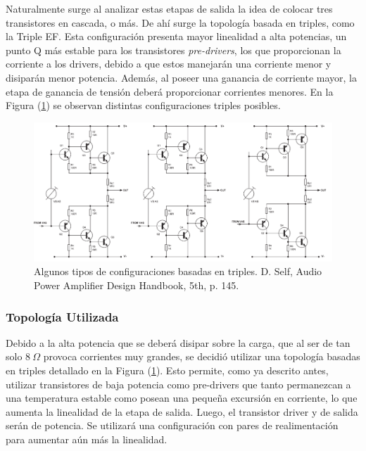 Naturalmente surge al analizar estas etapas de salida la idea de colocar tres transistores en cascada, o más. De ahí surge la topología basada en triples, como la Triple EF. Esta configuración presenta mayor linealidad a alta potencias, un punto Q más estable para los transistores \textit{pre-drivers}, los que proporcionan la corriente a los drivers, debido a que estos manejarán una corriente menor y disiparán menor potencia. Además, al poseer una ganancia de corriente mayor, la etapa de ganancia de tensión deberá proporcionar corrientes menores. En la Figura (\ref{fig:triples}) se observan distintas configuraciones triples posibles.

\begin{figure}[H]
\centering
	\includegraphics[width=\textwidth]{ImagenesOutput-Stage/pag145-triples.png}
	\caption{Algunos tipos de configuraciones basadas en triples. D. Self, Audio Power Amplifier Design Handbook, 5th, p. 145.}
	\label{fig:triples}
\end{figure}

\subsubsection{Topología Utilizada}
Debido a la alta potencia que se deberá disipar sobre la carga, que al ser de tan solo $8 \ \Omega$ provoca corrientes muy grandes, se decidió utilizar una topología basadas en triples detallado en la Figura (\ref{fig:triples}). Esto permite, como ya descrito antes, utilizar transistores de baja potencia como pre-drivers que tanto permanezcan a una temperatura estable como posean una pequeña excursión en corriente, lo que aumenta la linealidad de la etapa de salida. Luego, el transistor driver y de salida serán de potencia. Se utilizará una configuración con pares de realimentación para aumentar aún más la linealidad.

